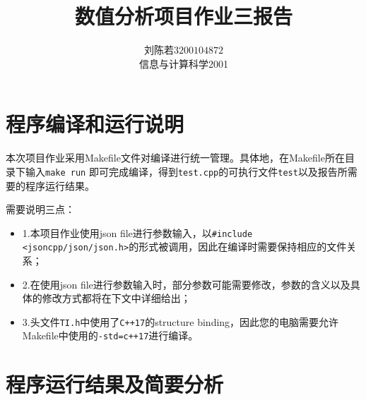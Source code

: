 \documentclass{ctexart}
\begin{document}
\begin{sloppypar}
\title{\vspace{-3cm} \textbf{数值分析项目作业三报告}}
\author{刘陈若\;$3200104872$\\信息与计算科学2001}
\date{}

\maketitle

\section{程序编译和运行说明}
本次项目作业采用Makefile文件对编译进行统一管理。具体地，在Makefile所在目录下输入\verb|make run|
即可完成编译，得到\verb|test.cpp|的可执行文件\verb|test|以及报告所需要的程序运行结果。

需要说明三点：
\begin{itemize}
    \item 1.本项目作业使用json file进行参数输入，以\verb|#include <jsoncpp/json/json.h>|的形式被调用，因此在编译时需要保持相应的文件关系；
    \item 2.在使用json file进行参数输入时，部分参数可能需要修改，参数的含义以及具体的修改方式都将在下文中详细给出；
    \item 3.头文件\verb|TI.h|中使用了\verb|C++17|的structure binding，因此您的电脑需要允许Makefile中使用的\verb|-std=c++17|进行编译。
\end{itemize}

\section{程序运行结果及简要分析}


\end{sloppypar}
\end{document}
